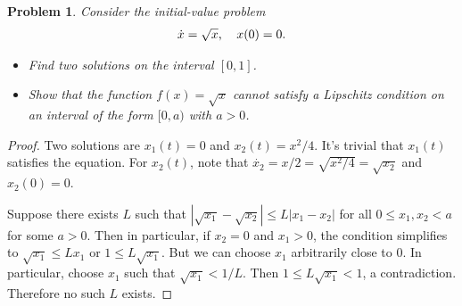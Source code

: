 \documentclass{article}
\newtheorem{problem}{Problem}
\begin{document}
\begin{problem}
Consider the initial-value problem
\[
\begin{tabular}{cc}
$\dot{x} = \sqrt{x}$, & $x(0) = 0$.
\end{tabular}
\]
\begin{itemize}
\item Find two solutions on the interval $[0,1]$.
\item Show that the function $f(x) = \sqrt{x}$ cannot satisfy a Lipschitz condition on an interval of the form $[0,a)$ with $a > 0$.
\end{itemize}
\end{problem}
\begin{proof}
Two solutions are $x_1(t) = 0$ and $x_2(t) = x^2/4$. It's trivial that $x_1(t)$ satisfies the equation. For $x_2(t)$, note that $\dot{x_2} = x/2 = \sqrt{x^2/4} = \sqrt{x_2}$ and $x_2(0) = 0$.

Suppose there exists $L$ such that $|\sqrt{x_1} - \sqrt{x_2}| \leq L|x_1 - x_2|$ for all $0 \leq x_1, x_2 < a$ for some $a > 0$. Then in particular, if $x_2 = 0$ and $x_1 > 0$, the condition simplifies to $\sqrt{x_1} \leq L x_1$ or $1 \leq L \sqrt{x_1}$. But we can choose $x_1$ arbitrarily close to $0$. In particular, choose $x_1$ such that $\sqrt{x_1} < 1/L$. Then $1 \leq L \sqrt{x_1} < 1$, a contradiction. Therefore no such $L$ exists.
\end{proof}
\end{document}
